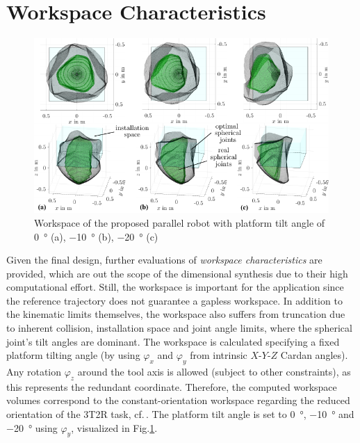 \documentclass[runningheads]{llncs}
\begin{document}
\section{Workspace Characteristics}\label{sec:performance}
\begin{figure}[tb] 
	\centering
	\vspace{-5mm}
	\includegraphics[width=1.0\linewidth]{workspaces.pdf}
	\caption{Workspace of the proposed parallel robot with platform tilt angle of \SI{0}{\degree} (a), \SI{-10}{\degree} (b), \SI{-20}{\degree} (c)}
	\label{fig:workspace}
	\vspace{-5mm}
\end{figure}
Given the final design, further evaluations of \emph{workspace characteristics} are provided, which are out the scope of the dimensional synthesis due to their high computational effort. 
Still, the workspace is important for the application since the reference trajectory does not guarantee a gapless workspace. %
In addition to the kinematic limits themselves, the workspace also suffers from truncation due to inherent collision, installation space and joint angle limits, where the spherical joint's tilt angles are dominant. 
The workspace is calculated specifying a fixed platform tilting angle (by using $\varphi_x$ and $\varphi_y$ from  intrinsic $X$-$Y$-$Z$ Cardan angles). 
Any rotation $\varphi_z$ around the tool axis is allowed (subject to other constraints), as this represents the redundant coordinate. 
Therefore, the computed workspace volumes correspond to the constant-orientation workspace regarding the reduced orientation of the 3T2R task, cf.\,\cite{Merlet2006}.
The platform tilt angle is set to \SI{0}{\degree}, \SI{-10}{\degree} and \SI{-20}{\degree} using $\varphi_y$, visualized in Fig.\ref{fig:workspace}. 
\end{document}
